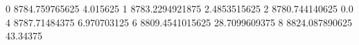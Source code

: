 0 8784.759765625 4.015625
1 8783.2294921875 2.4853515625
2 8780.744140625 0.0
4 8787.71484375 6.970703125
6 8809.4541015625 28.7099609375
8 8824.087890625 43.34375
